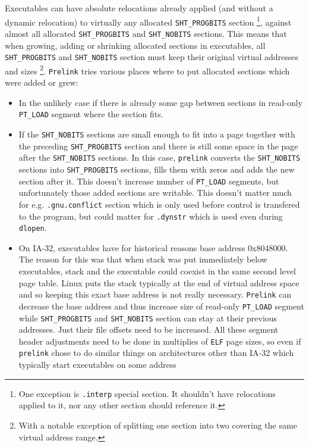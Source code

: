 \documentclass[twoside]{article}
\def\tts#1{\texttt{\small #1}}
\begin{document}
Executables can have absolute relocations already applied (and without a
dynamic relocation) to virtually any allocated \tts{SHT\_PROGBITS} section
\footnote{One exception is \tts{.interp} special section.  It shouldn't have
relocations applied to it, nor any other section should reference it.},
against almost all allocated \tts{SHT\_PROGBITS} and \tts{SHT\_NOBITS}
sections.  This means that when growing, adding or shrinking allocated
sections in executables, all \tts{SHT\_PROGBITS} and \tts{SHT\_NOBITS} section
must keep their original virtual addresses and sizes
\footnote{With a notable exception of splitting one section into two
covering the same virtual address range.}. \tts{Prelink} tries various
places where to put allocated sections which were added or grew:
\begin{itemize}
\item In the unlikely case if there is already some gap between
sections in read-only \tts{PT\_LOAD} segment where the section fits.
\item If the \tts{SHT\_NOBITS} sections are small enough to fit
into a page together with the preceding \tts{SHT\_PROGBITS} section and there
is still some space in the page after the \tts{SHT\_NOBITS} sections.
In this case, \tts{prelink} converts the \tts{SHT\_NOBITS} sections into
\tts{SHT\_PROGBITS} sections, fills them with zeros and adds the new section
after it.  This doesn't increase number of \tts{PT\_LOAD} segments, but
unfortunately those added sections are writable.  This doesn't matter
much for e.g. \tts{.gnu.conflict} section which is only used before control
is transfered to the program, but could matter for \tts{.dynstr} which is
used even during \tts{dlopen}.
\item On IA-32, executables have for historical reasons base address 0x8048000.
The reason for this was that when stack was put immediately below executables,
stack and the executable could coexist in the same second level page table.
Linux puts the stack typically at the end of virtual address space and so
keeping this exact base address is not really necessary.  \tts{Prelink} can
decrease the base address and thus increase size of read-only \tts{PT\_LOAD}
segment while \tts{SHT\_PROGBITS} and \tts{SHT\_NOBITS} section can stay
at their previous addresses.  Just their file offsets need to be increased.
All these segment header adjustments need to be done in multiplies of
\tts{ELF} page sizes, so even if \tts{prelink} chose to do similar things
on architectures other than IA-32 which typically start executables on some address

\end{itemize}
\end{document}
